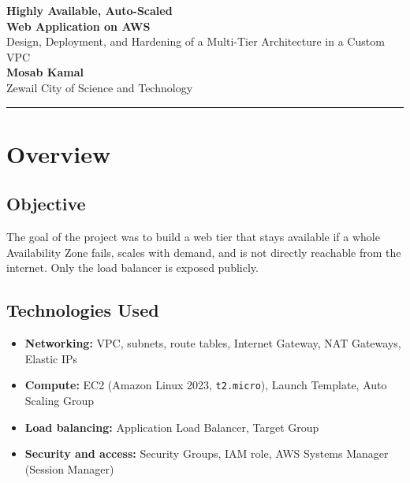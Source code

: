 \documentclass[11pt,a4paper]{article}
\begin{document}
\begin{center}
  {\Huge\bfseries\color{awsorange} Highly Available, Auto-Scaled\\[4pt] Web Application on AWS}\\[14pt]
  {\large Design, Deployment, and Hardening of a Multi-Tier Architecture in a Custom VPC}\\[14pt]
  \textbf{Mosab Kamal}\\
  Zewail City of Science and Technology\\[4pt]

\end{center}

\vspace{6pt}
\hrule
\vspace{10pt}

\begin{abstract}
\noindent
This report documents the design and deployment of a highly available, auto-scaled web application on Amazon Web Services. The solution is built inside a custom VPC that spans two Availability Zones, with web servers placed in private subnets, public traffic served through an Application Load Balancer, and outbound access provided by one NAT Gateway per Availability Zone. Instance management uses AWS Systems Manager (SSM) instead of SSH keys, and the security groups are restricted following the principle of least privilege. The report covers the architecture, implementation steps, verification, security decisions, and cleanup.
\end{abstract}

\tableofcontents
\newpage

\section{Overview}
\subsection{Objective}
The goal of the project was to build a web tier that stays available if a whole Availability Zone fails, scales with demand, and is not directly reachable from the internet. Only the load balancer is exposed publicly.

\subsection{Technologies Used}
\begin{itemize}
  \item \textbf{Networking:} VPC, subnets, route tables, Internet Gateway, NAT Gateways, Elastic IPs
  \item \textbf{Compute:} EC2 (Amazon Linux 2023, \texttt{t2.micro}), Launch Template, Auto Scaling Group
  \item \textbf{Load balancing:} Application Load Balancer, Target Group
  \item \textbf{Security and access:} Security Groups, IAM role, AWS Systems Manager (Session Manager)
\end{itemize}
\end{document}
